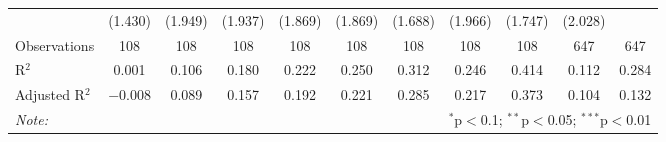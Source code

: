 \begin{tabular}{@{\hspace{5pt}}l@{\hspace{5pt}}cccccccccc}
  & (1.430) & (1.949) & (1.937) & (1.869) & (1.869) & (1.688) & (1.966) & (1.747) & (2.028) &  \\ 
 \addlinespace 
\midrule  
Observations & 108 & 108 & 108 & 108 & 108 & 108 & 108 & 108 & 647 & 647 \\ 
R$^{2}$ & 0.001 & 0.106 & 0.180 & 0.222 & 0.250 & 0.312 & 0.246 & 0.414 & 0.112 & 0.284 \\ 
Adjusted R$^{2}$ & $-$0.008 & 0.089 & 0.157 & 0.192 & 0.221 & 0.285 & 0.217 & 0.373 & 0.104 & 0.132 \\ 
\bottomrule 
\textit{Note:}  & \multicolumn{10}{r}{$^{*}$p$<$0.1; $^{**}$p$<$0.05; $^{***}$p$<$0.01} \\ 
\end{tabular} 
